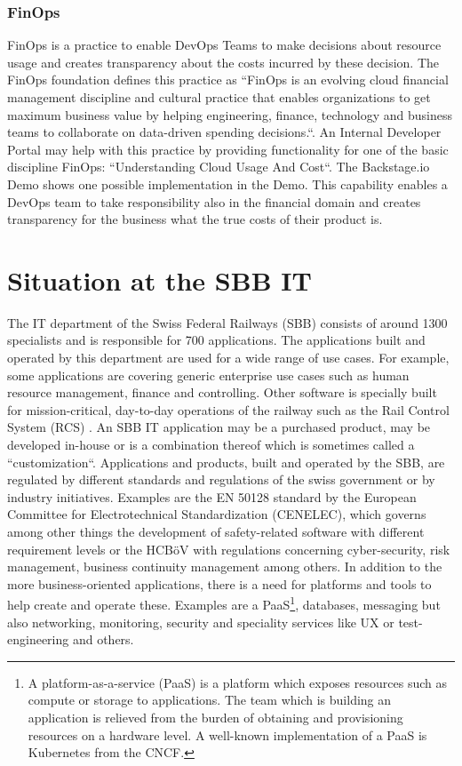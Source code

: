 \documentclass[a4paper,12pt]{article}
\begin{document}
    \subsubsection{FinOps}
    \label{sssec:finops}
    FinOps is a practice to enable DevOps Teams to make decisions about resource usage and creates transparency
    about the costs incurred by these decision.
    The FinOps foundation defines\parencite{finopsdefinition} this practice as ``FinOps is an evolving cloud financial management discipline and
    cultural practice that enables organizations to get maximum business value by helping engineering, finance,
    technology and business teams to collaborate on data-driven spending decisions.``.
    An Internal Developer Portal may help with this practice by providing functionality for one of the basic discipline
    FinOps: ``Understanding Cloud Usage And Cost``.
    The Backstage.io Demo shows one possible implementation in the Demo\parencite{backstagedemocost}.
    This capability enables a DevOps team to take responsibility also in the financial domain and creates transparency
    for the business what the true costs of their product is.


    \section{Situation at the SBB IT}
    \label{sec:sbbit}
    The IT department of the Swiss Federal Railways (SBB) consists of around 1300 specialists and is responsible for
    700 applications\parencite{sbbitkennzahlen}.
    The applications built and operated by this department are used for a wide range of use cases.
    For example, some applications are covering generic enterprise use cases such as human resource management, finance
    and controlling.
    Other software is specially built for mission-critical, day-to-day operations of the railway such as the Rail Control
    System (RCS)\parencite{sbbrcs} .
    An SBB IT application may be a purchased product, may be developed in-house or is a combination thereof which is
    sometimes called a ``customization``.
    Applications and products, built and operated by the SBB, are regulated by different standards and regulations of the
    swiss government or by industry initiatives.
    Examples are the EN 50128 standard by the European Committee for Electrotechnical Standardization (CENELEC)\parencite{cenelec},
    which governs among other things the development of safety-related software with different requirement levels
    or the HCBöV\parencite{hcboev} with regulations concerning cyber-security, risk management, business continuity
    management among others.
    In addition to the more business-oriented applications, there is a need for platforms and tools to help create
    and operate these.
    Examples are a PaaS\footnote{A platform-as-a-service (PaaS) is a platform which exposes resources such as compute or
    storage to applications. The team which is building an application is relieved from the burden of obtaining and
    provisioning resources on a hardware level. A well-known implementation of a PaaS is Kubernetes from the CNCF.},
    databases, messaging but also networking, monitoring, security and
    speciality services like UX or test-engineering and others.
\end{document}
